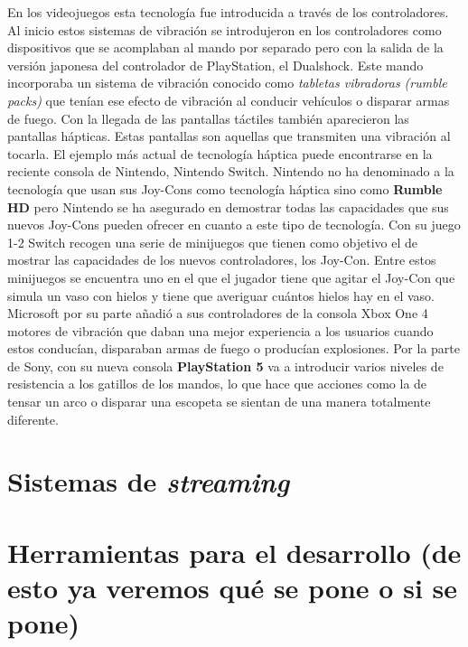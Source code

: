 En los videojuegos esta tecnolog\'ia fue introducida a trav\'es de los controladores. Al inicio estos sistemas de vibraci\'on se introdujeron en los controladores como dispositivos que se acomplaban al mando por separado pero con la salida de la versi\'on japonesa del controlador de PlayStation, el Dualshock. Este mando incorporaba un sistema de vibraci\'on conocido como \textit{tabletas vibradoras (rumble packs)} que ten\'ian ese efecto de vibraci\'on al conducir veh\'iculos o disparar armas de fuego. Con la llegada de las pantallas t\'actiles tambi\'en aparecieron las pantallas h\'apticas. Estas pantallas son aquellas que transmiten una vibraci\'on al tocarla. El ejemplo m\'as actual de tecnolog\'ia h\'aptica puede encontrarse en la reciente consola de Nintendo, Nintendo Switch. Nintendo no ha denominado a la tecnolog\'ia que usan sus Joy-Cons como tecnolog\'ia h\'aptica sino como \textbf{Rumble HD} pero Nintendo se ha asegurado en demostrar todas las capacidades que sus nuevos Joy-Cons pueden ofrecer en cuanto a este tipo de tecnolog\'ia. Con su juego 1-2 Switch recogen una serie de minijuegos que tienen como objetivo el de mostrar las capacidades de los nuevos controladores, los Joy-Con. Entre estos minijuegos se encuentra uno en el que el jugador tiene que agitar el Joy-Con que simula un vaso con hielos y tiene que averiguar cu\'antos hielos hay en el vaso. Microsoft por su parte a\~nadi\'o a sus controladores de la consola Xbox One 4 motores de vibraci\'on que daban una mejor experiencia a los usuarios cuando estos conduc\'ian, disparaban armas de fuego o produc\'ian explosiones.  Por la parte de Sony, con su nueva consola \textbf{PlayStation 5} va a introducir varios niveles de resistencia a los gatillos de los mandos, lo que hace que acciones como la de tensar un arco o disparar una escopeta se sientan de una manera totalmente diferente.
\section{Sistemas de \textit{streaming}}



\section{Herramientas para el desarrollo (de esto ya veremos qu\'e se pone o si se pone)}
\label{cap2:sec:herramientas}

